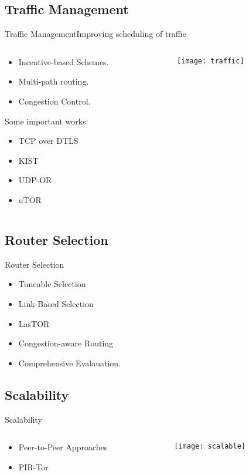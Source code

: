 \documentclass{beamer}
\begin{document}
\subsection{Traffic Management}
\begin{frame}{Traffic Management}{Improving scheduling of traffic}
\begin{columns}[c]
  \begin{column}{0.5\textwidth}
\begin{itemize}
    \item Incentive-based Schemes.
    \item Multi-path routing.
    \item Congestion Control.
\end{itemize}
\alert{Some important works:}
\begin{itemize}
    \item TCP over DTLS
    \item KIST
    \item UDP-OR
    \item uTOR
\end{itemize}
\end{column}
  \begin{column}{0.5\textwidth}
  \texttt{[image: traffic]}
  \end{column}
\end{columns} 
\end{frame}

\subsection{Router Selection}
\begin{frame}{Router Selection}
    \begin{itemize}
    \item Tuneable Selection
    \item Link-Based Selection
    \item LasTOR
    \item Congestion-aware Routing
    \item Comprehensive Evalauation.
    \end{itemize}
    
\end{frame}
\subsection{Scalability}
\begin{frame}{Scalability}
\begin{columns}
  \begin{column}{0.4\textwidth}
    \begin{itemize}
        \item Peer-to-Peer Approaches
        \item PIR-Tor
    \end{itemize}
\end{column}
  \begin{column}{0.6\textwidth}
  \texttt{[image: scalable]}

\end{column}
\end{columns}
\end{frame}
\end{document}
